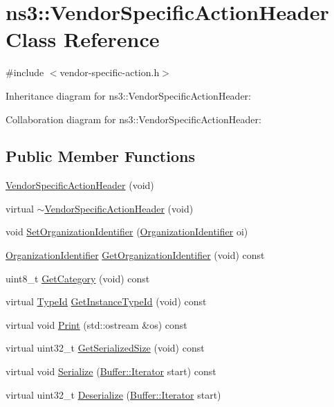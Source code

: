 \hypertarget{classns3_1_1VendorSpecificActionHeader}{}\section{ns3\+:\+:Vendor\+Specific\+Action\+Header Class Reference}
\label{classns3_1_1VendorSpecificActionHeader}


{\ttfamily \#include $<$vendor-\/specific-\/action.\+h$>$}



Inheritance diagram for ns3\+:\+:Vendor\+Specific\+Action\+Header\+:


Collaboration diagram for ns3\+:\+:Vendor\+Specific\+Action\+Header\+:
\subsection*{Public Member Functions}
\begin{DoxyCompactItemize}
\item 
\hyperlink{classns3_1_1VendorSpecificActionHeader_a0f89c7d45dc4e15751a2419bb7f7fa95}{Vendor\+Specific\+Action\+Header} (void)
\item 
virtual \hyperlink{classns3_1_1VendorSpecificActionHeader_a42e483054de963ece0eb8fd30e6f0f49}{$\sim$\+Vendor\+Specific\+Action\+Header} (void)
\item 
void \hyperlink{classns3_1_1VendorSpecificActionHeader_a9a064b10029911e8967a205efd32da6a}{Set\+Organization\+Identifier} (\hyperlink{classns3_1_1OrganizationIdentifier}{Organization\+Identifier} oi)
\item 
\hyperlink{classns3_1_1OrganizationIdentifier}{Organization\+Identifier} \hyperlink{classns3_1_1VendorSpecificActionHeader_af87c661f55c7b9ab54638a1c0fa9c022}{Get\+Organization\+Identifier} (void) const 
\item 
uint8\+\_\+t \hyperlink{classns3_1_1VendorSpecificActionHeader_a3030c0a79d5c618bc9695150788bf4a0}{Get\+Category} (void) const 
\item 
virtual \hyperlink{classns3_1_1TypeId}{Type\+Id} \hyperlink{classns3_1_1VendorSpecificActionHeader_a09db0be450f65c71380fc664e2cec350}{Get\+Instance\+Type\+Id} (void) const 
\item 
virtual void \hyperlink{classns3_1_1VendorSpecificActionHeader_af5df6e3e6ee43ed468fbb62a075d58af}{Print} (std\+::ostream \&os) const 
\item 
virtual uint32\+\_\+t \hyperlink{classns3_1_1VendorSpecificActionHeader_ac06b54f4fa02b0e05519ec413fbaf706}{Get\+Serialized\+Size} (void) const 
\item 
virtual void \hyperlink{classns3_1_1VendorSpecificActionHeader_ad19d4c69e11cc057ad72d20099aa6b8c}{Serialize} (\hyperlink{classns3_1_1Buffer_1_1Iterator}{Buffer\+::\+Iterator} start) const 
\item 
virtual uint32\+\_\+t \hyperlink{classns3_1_1VendorSpecificActionHeader_a8a976570912a0ac4c0fafbaafd4a9ee4}{Deserialize} (\hyperlink{classns3_1_1Buffer_1_1Iterator}{Buffer\+::\+Iterator} start)
\end{DoxyCompactItemize}
